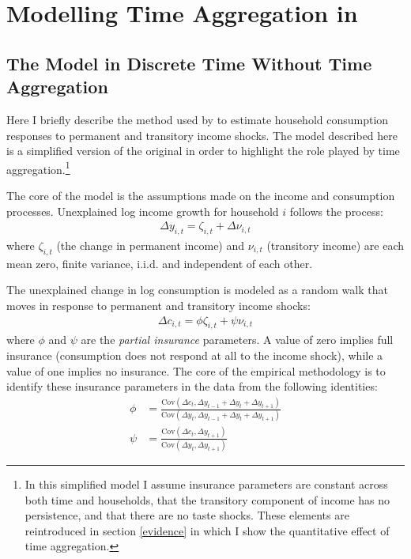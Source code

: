\documentclass[AER]{AEA}
\begin{document}
\section{Modelling Time Aggregation in \cite{blundell_consumption_2008}} \label{BPP}

\subsection{The Model in Discrete Time Without Time Aggregation}
Here I briefly describe the method used  by \cite{blundell_consumption_2008} to estimate household consumption responses to permanent and transitory income shocks. The model described here is a simplified version of the original in order to highlight the role played by time aggregation.\footnote{In this simplified model I assume insurance parameters are constant across both time and households, that the transitory component of income has no persistence, and that there are no taste shocks. These elements are reintroduced in section \ref{evidence} in which I show the quantitative effect of time aggregation.} 

 The core of the model is the assumptions made on the income and consumption processes. Unexplained log income growth for household $i$ follows the process:
\begin{align*}
\Delta y_{i,t} = \zeta_{i,t} + \Delta \nu_{i,t}
\end{align*}
where $\zeta_{i,t}$ (the change in permanent income) and $\nu_{i,t}$ (transitory income) are each mean zero, finite variance, i.i.d. and independent of each other.

The unexplained change in log consumption is modeled as a random walk that moves in response to permanent and transitory income shocks:
\begin{align*}
\Delta c_{i,t} = \phi \zeta_{i,t} + \psi \nu_{i,t} 
\end{align*}
where $\phi$ and $\psi$ are the \textit{partial insurance} parameters. A value of zero implies full insurance (consumption does not respond at all to the income shock), while a value of one implies no insurance. The core of the empirical methodology is to identify these insurance parameters in the data from the following identities:
\begin{align}
\phi&= \frac{\mathrm{Cov}(\Delta c_{t}, \Delta y_{t-1}+\Delta y_{t}+\Delta y_{t+1})}{\mathrm{Cov}(\Delta y_{t}, \Delta y_{t-1}+\Delta y_{t}+\Delta y_{t+1})} \label{phi}\\
\psi&= \frac{\mathrm{Cov}(\Delta c_{t},\Delta y_{t+1})}{\mathrm{Cov}(\Delta y_{t},\Delta y_{t+1})} \label{psi}
\end{align}
\end{document}
